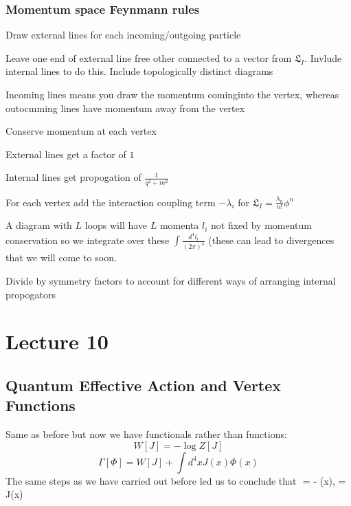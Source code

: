 \documentclass{article}
\begin{document}
\subsubsection{Momentum space Feynmann rules}
\begin{itemlist}
\item Draw external lines for each incoming/outgoing particle\\
\item Leave one end of external line free other connected to a vector from $\mathfrak{L}_I$. Invlude internal lines to do this. Include topologically distinct diagrams\\
\item Incoming lines means you draw the momentum cominginto the vertex, whereas outocmming lines have momentum away from the vertex\\
\item Conserve momentum at each vertex\\
\item External lines get a factor of $1$\\
\item Internal lines get propogation of $\frac{1}{q^2 + m^2}$\\
\item For each vertex add the interaction coupling term $- \lambda_i$ for $\mathfrak{L}_I = \frac{\lambda_n}{n!} \phi^n$\\
\item A diagram with $L$ loops will have $L$ momenta $l_i$ not fixed by momentum conservation so we integrate over these $\int \frac{d^4 l_i}{(2\pi)^4}$ (these can lead to divergences that we will come to soon.\\
\item Divide by symmetry factors to account for different ways of arranging internal propogators
\end{itemlist}
\section{Lecture 10}
\subsection{Quantum Effective Action and Vertex Functions}
Same as before but now we have functionals rather than functions:
$$
W[J] = - \log Z[J]
$$
$$
\Gamma[\Phi] = W[J] + \int d^4 x J(x) \Phi(x)
$$
The same steps as we have carried out before led us to conclude that 
$$
 = - \Phi(x),  = J(x)
\end{document}
